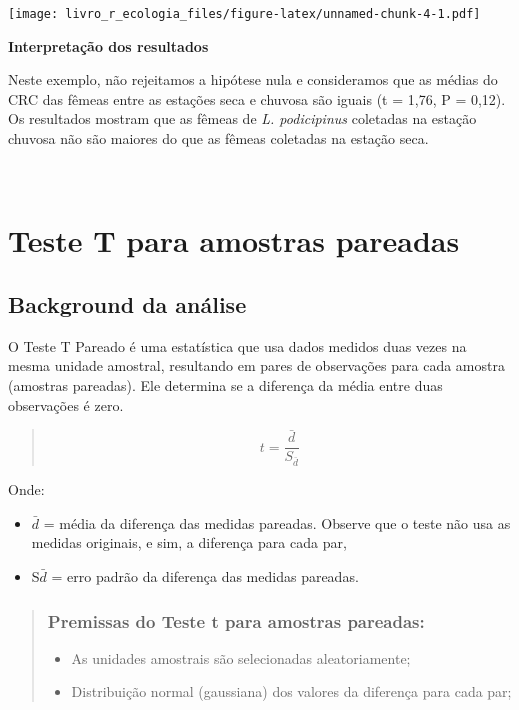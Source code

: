 \documentclass[
]{book}
\providecommand{\tightlist}{%
  \setlength{\itemsep}{0pt}\setlength{\parskip}{0pt}}
\begin{document}
\texttt{[image: livro\_r\_ecologia\_files/figure-latex/unnamed-chunk-4-1.pdf]}

\textbf{Interpretação dos resultados}

Neste exemplo, não rejeitamos a hipótese nula e consideramos que as médias do CRC das fêmeas entre as estações seca e chuvosa são iguais (t = 1,76, P = 0,12). Os resultados mostram que as fêmeas de \emph{L. podicipinus} coletadas na estação chuvosa não são maiores do que as fêmeas coletadas na estação seca.

~

\hypertarget{teste-t-para-amostras-pareadas}{%
\section{Teste T para amostras pareadas}\label{teste-t-para-amostras-pareadas}}

\hypertarget{background-da-anuxe1lise-1}{%
\subsection{Background da análise}\label{background-da-anuxe1lise-1}}

O Teste T Pareado é uma estatística que usa dados medidos duas vezes na mesma unidade amostral, resultando em pares de observações para cada amostra (amostras pareadas). Ele determina se a diferença da média entre duas observações é zero.

\begin{quote}
\[ t = \frac{\bar{d}}{S_{\bar{d}}}\]
\end{quote}

Onde:

\begin{itemize}
\item
  \(\bar{d}\) = média da diferença das medidas pareadas. Observe que o teste não usa as medidas originais, e sim, a diferença para cada par,
\item
  S\(\bar{d}\) = erro padrão da diferença das medidas pareadas.
\end{itemize}

\begin{quote}
\hypertarget{premissas-do-teste-t-para-amostras-pareadas}{%
\subsubsection{Premissas do Teste t para amostras pareadas:}\label{premissas-do-teste-t-para-amostras-pareadas}}

\begin{itemize}
\tightlist
\item
  As unidades amostrais são selecionadas aleatoriamente;
\item
  Distribuição normal (gaussiana) dos valores da diferença para cada par;
\end{itemize}
\end{quote}
\end{document}
